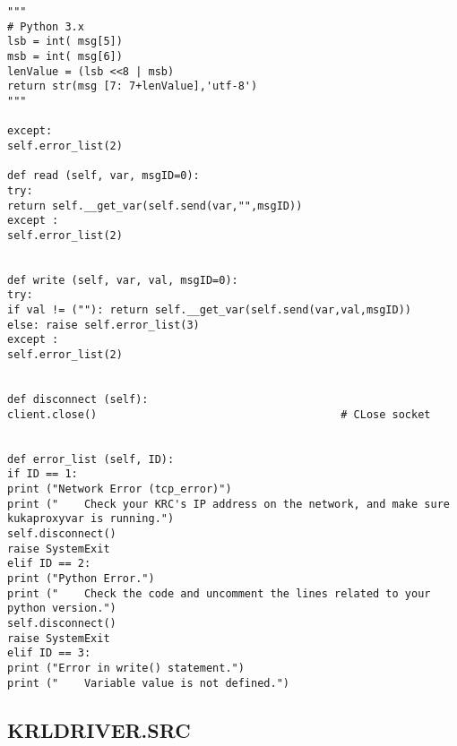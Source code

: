 \begin{lstlisting}[language=terCmd]
"""
# Python 3.x
lsb = int( msg[5])
msb = int( msg[6])
lenValue = (lsb <<8 | msb)
return str(msg [7: 7+lenValue],'utf-8')  
"""

except:
self.error_list(2)

def read (self, var, msgID=0):
try:
return self.__get_var(self.send(var,"",msgID))  
except :
self.error_list(2)


def write (self, var, val, msgID=0):
try:
if val != (""): return self.__get_var(self.send(var,val,msgID))
else: raise self.error_list(3)
except :
self.error_list(2)


def disconnect (self):
client.close()                                      # CLose socket


def error_list (self, ID):
if ID == 1:
print ("Network Error (tcp_error)")
print ("    Check your KRC's IP address on the network, and make sure kukaproxyvar is running.")
self.disconnect()
raise SystemExit
elif ID == 2:
print ("Python Error.")
print ("    Check the code and uncomment the lines related to your python version.")
self.disconnect()
raise SystemExit
elif ID == 3:
print ("Error in write() statement.")
print ("    Variable value is not defined.")
\end{lstlisting}


\newpage
\subsection{KRLDRIVER.SRC}

